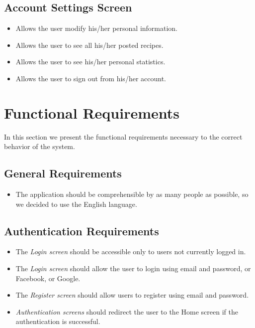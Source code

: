 	\subsection{Account Settings Screen}
		\begin{itemize}
			\item Allows the user modify his/her personal information.
			
			\item Allows the user to see all his/her posted recipes.
			
			\item Allows the user to see his/her personal statistics.
			
			\item Allows the user to sign out from his/her account.
		\end{itemize}


\section{Functional Requirements}
	In this section we present the functional requirements necessary to the correct behavior of the system.

	\subsection{General Requirements}
		\begin{itemize}
			\item The application should be comprehensible by as many people as possible, so we decided to use the English language.
		\end{itemize}

	\subsection{Authentication Requirements}
		\begin{itemize}
			\item The \textit{Login screen} should be accessible only to users not currently logged in.
			\item The \textit{Login screen} should allow the user to login using email and password, or Facebook, or Google.
			\item The \textit{Register screen} should allow users to register using email and password. 
			\item \textit{Authentication screens} should redirect the user to the Home screen if the authentication is successful.
		\end{itemize}

